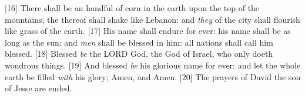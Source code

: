 [16] \textcolor[cmyk]{0.99998,1,0,0}{There shall be an handful of corn in the earth upon the top of the mountains; the  thereof shall shake like Lebanon: and \emph{they} of the city shall flourish like grass of the earth.}
[17] \textcolor[cmyk]{0.99998,1,0,0}{His name shall endure for ever: his name shall be  as long as the sun: and \emph{men} shall be blessed in him: all nations shall call him blessed.}
[18] \textcolor[cmyk]{0.99998,1,0,0}{Blessed \emph{be} the LORD God, the God of Israel, who only doeth wondrous things.}
[19] \textcolor[cmyk]{0.99998,1,0,0}{And blessed \emph{be} his glorious name for ever: and let the whole earth be filled \emph{with} his glory; Amen, and Amen.}
[20] \textcolor[cmyk]{0.99998,1,0,0}{The prayers of David the son of Jesse are ended.}

